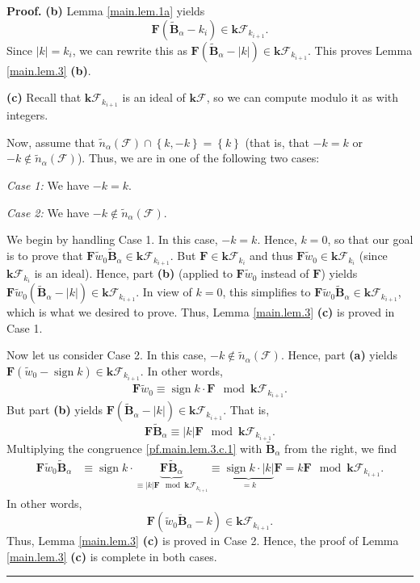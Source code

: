 \documentclass[12pt]{article}
\theoremstyle{definition}%
\theoremstyle{definition}%
\theoremstyle{remark}%
\newcommand{\tup}[1]{\left( #1 \right)}
\newcommand{\set}[1]{\left\{ #1 \right\}}
\newcommand{\abs}[1]{\left| #1 \right|} %
\newcommand{\kk}{\mathbf{k}}
\newcommand{\kf}{\kk\mathcal{F}}
\newcommand{\BBta}{\widetilde{\mathbf{B}}_{\alpha}}
\newcommand{\FF}{\mathbf{F}}
\newcommand{\CF}{\mathcal{F}}
\newcommand{\wotil}{\widetilde{w}_0}
\newcommand{\na}{n_{ \alpha } }%
\newcommand{\nna}{\widetilde{n}_{ \alpha } }%
\newcommand{\sign}{\operatorname{sign}}
\newenvironment{proof}[1][Proof]{\noindent\textbf{#1.} }{\ \rule{0.5em}{0.5em}}
\begin{document}
\begin{proof}
\textbf{(b)}
Lemma \ref{main.lem.1a} yields
\[
\FF \tup{\BBta - k_i}
\in \kf_{k_{i+1}} .
\]
Since $\abs{k} = k_i$, we can rewrite this as
$\FF\left(  \BBta-\abs{k} \right)
\in \kf_{k_{i+1}}$.
This proves Lemma \ref{main.lem.3} \textbf{(b)}. \medskip

\textbf{(c)} Recall that $\kf_{k_{i+1}}$ is an ideal of
$\kf$, so we can compute modulo it as with integers.

Now, assume that $\nna \tup{\CF} \cap \set{k,-k} = \set{k}$
(that is, that $-k = k$ or $-k \notin \nna\tup{\CF}$).
Thus, we are in one of the following two cases:

\textit{Case 1:} We have $-k = k$.

\textit{Case 2:} We have $-k \notin \nna\tup{\CF}$.

We begin by handling Case 1. In this case, $-k = k$.
Hence, $k = 0$, %
so that our goal is to prove that
$\FF\wotil \BBta \in \kf_{k_{i+1}}$.
But $\FF \in \kf_{k_i}$ and thus
$\FF\wotil \in \kf_{k_i}$
(since $\kf_{k_i}$ is an ideal).
Hence, part \textbf{(b)} (applied to $\FF\wotil$
instead of $\FF$) yields
$\FF\wotil
\left(  \BBta-\abs{k} \right)
\in \kf_{k_{i+1}}$.
In view of $k = 0$, this simplifies to
$\FF\wotil \BBta \in \kf_{k_{i+1}}$,
which is what we desired to prove.
Thus, Lemma \ref{main.lem.3} \textbf{(c)} is proved in Case 1.

Now let us consider Case 2. In this case,
$-k \notin \nna\tup{\CF}$. Hence, part
\textbf{(a)} yields
$\FF \tup{\wotil - \sign k} \in \kf_{k_{i+1}}$.
In other words,
\begin{align}
\FF\wotil \equiv \sign k\cdot\FF
\mod \kf_{k_{i+1}}.
\label{pf.main.lem.3.c.1}
\end{align}
But part \textbf{(b)} yields
$\FF \tup{\BBta - \abs{k}} \in \kf_{k_{i+1}}$.
That is,
\[
\FF\BBta \equiv \abs{k} \FF
\mod \kf_{k_{i+1}}.
\]
Multiplying the congruence \eqref{pf.main.lem.3.c.1}
with $\BBta$ from the right, we find
\begin{align*}
\FF \wotil \BBta
& \equiv\sign k\cdot\underbrace{\FF
\BBta}_{\equiv\abs{k} \FF
\mod\kf_{k_{i+1}}}
\equiv\underbrace{\sign k\cdot\abs{k} }_{=k}\FF
=k\FF\mod\kf_{k_{i+1}}.
\end{align*}
In other words,
\[
\FF\tup{\wotil\BBta - k}\in\kf_{k_{i+1}}.
\]
Thus, Lemma \ref{main.lem.3} \textbf{(c)} is proved in Case 2.
Hence, the proof of Lemma \ref{main.lem.3} \textbf{(c)} is complete in both cases.
\end{proof}
\end{document}
